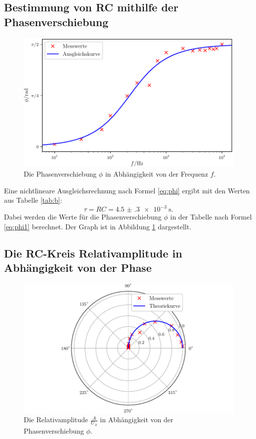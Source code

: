 \subsection{Bestimmung von RC mithilfe der Phasenverschiebung}
\label{subsec:3}
\begin{figure}
	\centering
	\includegraphics[width=\linewidth-100pt,height=\textheight-100pt,keepaspectratio]{content/images/Graph3.pdf}
	\caption{Die Phasenverschiebung $\phi$ in Abhängigkeit von der Frequenz $f$.}
	\label{fig:Graph3}
\end{figure}

\noindent Eine nichtlineare Ausgleichsrechnung nach Formel \eqref{eq:phi} ergibt mit den Werten aus Tabelle \ref{tab:b}:
\[
\tau = RC = \SI{4.5(3)e-3}{\second}\text{.}
\]
Dabei werden die Werte für die Phasenverschiebung $\phi$ in der Tabelle nach Formel \eqref{eq:phi1} berechnet. Der Graph ist in Abbildung \ref{fig:Graph3} dargestellt.

\subsection{Die RC-Kreis Relativamplitude in Abhängigkeit von der Phase}
\label{subsec:4}
\begin{figure}
	\centering
	\includegraphics[width=\linewidth-70pt,height=\textheight-70pt,keepaspectratio]{content/images/Graph4.pdf}
	\caption{Die Relativamplitude $\frac{A}{U_.0}$ in Abhängigkeit von der Phasenverschiebung $\phi$.}
	\label{fig:Graph4}
\end{figure}


